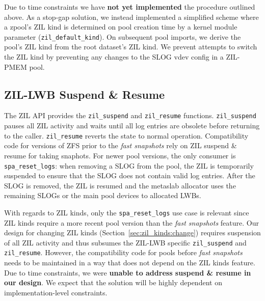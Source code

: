 \documentclass[12pt,a4paper,twoside]{book}
\begin{document}
Due to time constraints we have \textbf{not yet implemented} the procedure outlined above.
As a stop-gap solution, we instead implemented a simplified scheme where a zpool's ZIL kind is determined on pool creation time by a kernel module parameter (\lstinline{zil_default_kind}).
On subsequent pool imports, we derive the pool's ZIL kind from the root dataset's ZIL kind.
We prevent attempts to switch the ZIL kind by preventing any changes to the SLOG vdev config in a ZIL-PMEM pool.


\subsection{ZIL-LWB Suspend \& Resume}\label{sec:zil_kinds:suspend_resume}
The ZIL API provides the \lstinline{zil_suspend} and \lstinline{zil_resume} functions.
\lstinline{zil_suspend} pauses all ZIL activity and waits until all log entries are obsolete before returning to the caller.
\lstinline{zil_resume} reverts the state to normal operation.
Compatibility code for versions of ZFS prior to the \textit{fast snapshots} rely on ZIL suspend \& resume for taking snaphots.
For newer pool versions, the only consumer is \lstinline{spa_reset_logs}: when removing a SLOG from the pool, the ZIL is temporarily suspended to ensure that the SLOG does not contain valid log entries.
After the SLOG is removed, the ZIL is resumed and the metaslab allocator uses the remaining SLOGs or the main pool devices to allocated LWBs.

With regards to ZIL kinds, only the \lstinline{spa_reset_logs} use case is relevant since ZIL kinds require a more recent pool version than the \textit{fast snapshots} feature.
Our design for changing ZIL kinds (Section~\ref{sec:zil_kinds:change}) requires suspension of all ZIL activity and thus subsumes the ZIL-LWB specific \lstinline{zil_suspend} and \lstinline{zil_resume}.
However, the compatibility code for pools before \textit{fast snapshots} needs to be maintained in a way that does not depend on the ZIL kinds feature.
Due to time constraints, we were \textbf{unable to address suspend \& resume in our design}.
We expect that the solution will be highly dependent on implementation-level constraints.
\end{document}
